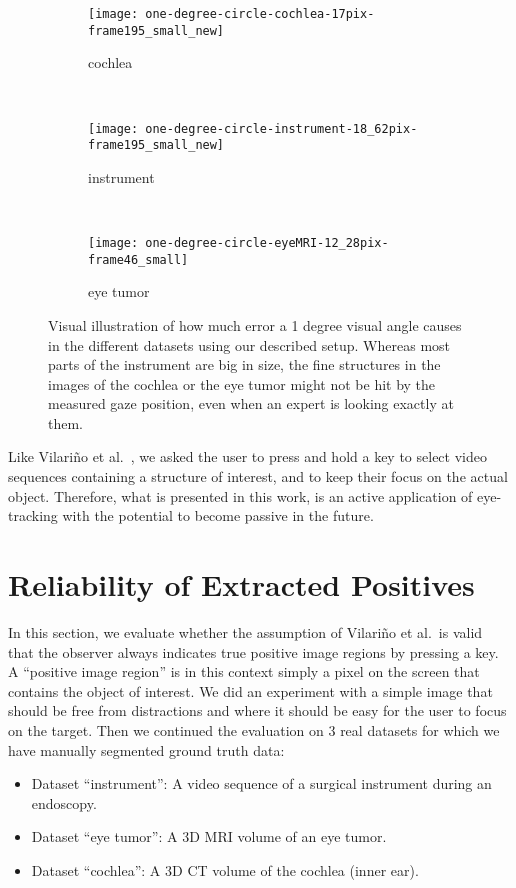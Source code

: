 \begin{figure}[ht]
	\centering
	\begin{subfigure}[h]{0.31\textwidth}
		\texttt{[image: one-degree-circle-cochlea-17pix-frame195\_small\_new]}	
		\caption*{cochlea}
	\end{subfigure}
	~
	\begin{subfigure}[h]{0.31\textwidth}
		\texttt{[image: one-degree-circle-instrument-18\_62pix-frame195\_small\_new]}
		\caption*{instrument}
	\end{subfigure}
	~
	\begin{subfigure}[h]{0.31\textwidth}
		\texttt{[image: one-degree-circle-eyeMRI-12\_28pix-frame46\_small]}	
		\caption*{eye tumor}
	\end{subfigure}
	\caption{Visual illustration of how much error a 1 degree visual angle causes in the different datasets using our described setup. Whereas most parts of the instrument are big in size, the fine structures in the images of the cochlea or the eye tumor might not be hit by the measured gaze position, even when an expert is looking exactly at them.}
	\label{fig:onedegreecircle}
\end{figure}

Like Vilari\~no et al.\ \cite{vilarino2007automatic}, we asked the user to press and hold a key to select video sequences containing a structure of interest, and to keep their focus on the actual object. 
Therefore, what is presented in this work, is an active application of eye-tracking with the potential to become passive in the future.

\section{Reliability of Extracted Positives}
In this section, we evaluate whether the assumption of Vilari\~no et al.\ is valid that the observer always indicates true positive image regions by pressing a key. 
A ``positive image region'' is in this context simply a pixel on the screen that contains the object of interest.
We did an experiment with a simple image that should be free from distractions and where it should be easy for the user to focus on the target. 
Then we continued the evaluation on 3 real datasets for which we have manually segmented ground truth data:
\begin{itemize}
 \item Dataset ``instrument'': A video sequence of a surgical instrument during an endoscopy.
 \item Dataset ``eye tumor'': A 3D MRI volume of an eye tumor.
 \item Dataset ``cochlea'': A 3D CT volume of the cochlea (inner ear).
\end{itemize}

